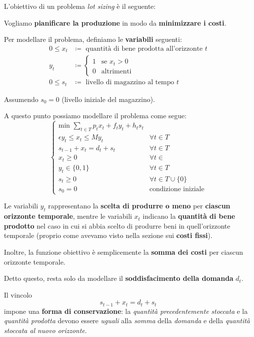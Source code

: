 L'obiettivo di un problema \textit{lot sizing} è il seguente:

\begin{exa}
    Vogliamo \textbf{pianificare la produzione} in modo da
    \textbf{minimizzare i costi}.
\end{exa}

Per modellare il problema, definiamo le \textbf{variabili} seguenti:
\[
    \begin{aligned}
        0 \le x_t &\coloneqq \text{ quantità di bene prodotta all'orizzonte } t \\ 
        y_t &\coloneqq  \begin{cases}
            1 & \text{se } x_t > 0 \\ 
            0 & \text{altrimenti}
        \end{cases} \\ 
            0 \le s_t &\coloneqq \text{ livello di magazzino al tempo } t
    \end{aligned}
\]

Assumendo $s_{0}=0$ (livello iniziale del magazzino).

A questo punto possiamo modellare il problema come segue:
\[
    \begin{cases}
        \displaystyle\text{min } \sum_{t\in T} p_t x_t + f_t y_t + h_t s_t \\ 
        \epsilon y_t \le x_t \le My_t & \forall t \in T \\
        s_{t-1} + x_t = d_t + s_t & \forall t \in T \\
        x_t \ge 0 & \forall t \in \\ 
        y_t \in \{0,1\} & \forall t\in T \\ 
        s_t \ge 0 & \forall t\in T \cup \{0\} \\ 
        s_0 = 0 & \text{condizione iniziale}
    \end{cases}
\]

Le variabili $y_t$ rappresentano la \textbf{scelta di produrre o meno} per
\textbf{ciascun orizzonte temporale}, mentre le variabili $x_t$ indicano
la \textbf{quantità di bene prodotto} nel caso in cui si abbia scelto
di produrre beni in quell'orizzonte temporale (proprio come avevamo visto
nella sezione sui \textbf{costi fissi}).

Inoltre, la funzione obiettivo è semplicemente la \textbf{somma dei costi} per 
ciascun orizzonte temporale.

Detto questo, resta solo da modellare il \textbf{soddisfacimento della domanda} $d_t$.

\begin{remark}
    Il vincolo
    \[
        s_{t-1} + x_t = d_t + s_t
    \]
    impone una \textbf{forma di conservazione}: la \textit{quantità precedentemente stoccata}
    e la \textit{quantità prodotta} devono essere \textit{uguali} alla \textit{somma}
    della \textit{domanda} e della \textit{quantità stoccata al nuovo orizzonte}.
\end{remark}
